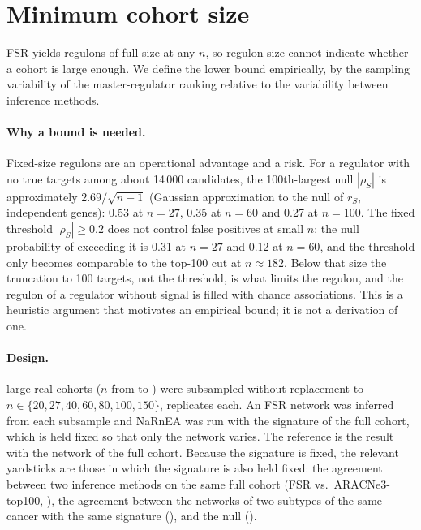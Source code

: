 \documentclass[11pt,a4paper]{article}
\providecommand{\KnullrankhundredNTwoSeven}{0.53}
\providecommand{\KnullrankhundredNSixZero}{0.35}
\providecommand{\KnullrankhundredNOneZeroZero}{0.27}
\providecommand{\KnullexceedNTwoSeven}{0.31}
\providecommand{\KnullexceedNSixZero}{0.12}
\providecommand{\KnullnstarThreshold}{182}
\theoremstyle{plain}
\theoremstyle{remark}
\newcommand{\rhoS}{\rho_{S}}
\newcommand{\FSR}{FSR}
\begin{document}
\section{Minimum cohort size}
\label{sec:minn}

\FSR{} yields regulons of full size at any $n$, so regulon size cannot indicate whether a cohort is
large enough. We define the lower bound empirically, by the sampling variability of the
master-regulator ranking relative to the variability between inference methods.

\paragraph{Why a bound is needed.} Fixed-size regulons are an operational advantage and a risk. For a regulator with no true targets among about
14\,000 candidates, the 100th-largest null $|\rhoS|$ is approximately $2.69/\sqrt{n-1}$ (Gaussian approximation to the null of $r_S$, independent genes): \KnullrankhundredNTwoSeven{} at $n=27$,
\KnullrankhundredNSixZero{} at $n=60$ and \KnullrankhundredNOneZeroZero{} at $n=100$. The fixed threshold $|\rhoS|\ge0.2$ does not control false positives at small $n$: the null probability of exceeding it is
\KnullexceedNTwoSeven{} at $n=27$ and \KnullexceedNSixZero{} at $n=60$, and the threshold only becomes comparable to the top-100 cut at $n\approx\KnullnstarThreshold$.
Below that size the truncation to 100 targets, not the threshold, is what limits the regulon, and the regulon of a regulator without signal is filled with chance associations. This is a heuristic argument that
motivates an empirical bound; it is not a derivation of one.

\paragraph{Design.} \Ksubsamplencohorts{} large real cohorts ($n$ from \Ksubsamplenfullmin{} to
\Ksubsamplenfullmax) were subsampled without replacement to
$n\in\{20,27,40,60,80,100,150\}$, \Ksubsamplereplicates{} replicates each. An \FSR{} network was
inferred from each subsample and NaRnEA was run with the signature of the full cohort, which is
held fixed so that only the network varies. The reference is the result with the network of the
full cohort. Because the signature is fixed, the relevant yardsticks are those in which the signature is also held fixed: the
agreement between two inference methods on the same full cohort (\FSR{} vs.\ ARACNe3-top100, \KAvsBmediantopTwoZero), the
agreement between the networks of two subtypes of the same cancer with the same signature (\KwithinnetmediantopTwoZero), and the null (\KnullmediantopTwoZero).
\end{document}
